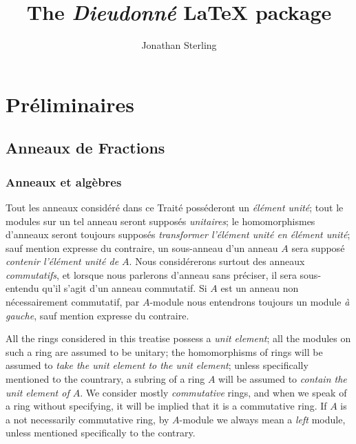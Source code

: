 \documentclass[french]{ega}
\title{The \emph{Dieudonné} \LaTeX{} package}
\author{Jonathan Sterling}
\begin{document}
\maketitle

\tableofcontents*

\mainmatter
{}
\chapter{Préliminaires}

\section{Anneaux de Fractions}

\subsection{Anneaux et algèbres}

\vspace{-1em}
\begin{minipage}[t]{0.5\textwidth}
  \begin{node}
    Tout les anneaux considéré dans ce Traité posséderont un
    \emph{élément unité}; tout le modules sur un tel anneau seront
    supposés \emph{unitaires}; le homomorphismes d'anneaux seront toujours
    supposés \emph{transformer l'élément unité en élément unité};
    sauf mention expresse du contraire, un sous-anneau d'un anneau \(A\) sera
    supposé \emph{contenir l'élément unité de \(A\)}. Nous considérerons
    surtout des anneaux \emph{commutatifs}, et lorsque nous parlerons  d'anneau
    sans préciser, il sera sous-entendu qu'il s'agit d'un anneau commutatif. Si
    \(A\) est un anneau non nécessairement commutatif, par \(A\)-module nous
    entendrons toujours un module \emph{à gauche}, sauf mention expresse du
    contraire.
  \end{node}
\end{minipage}
\quad
\begin{minipage}[t]{0.5\textwidth}
  \addtocounter{node}{-1}

  \begin{node}
    All the rings considered in this treatise possess a \emph{unit element};
    all the modules on such a ring are assumed to be unitary; the homomorphisms
    of rings will be assumed to \emph{take the unit element to the unit element};
    unless specifically mentioned to the countrary, a subring of a ring \(A\)
    will be assumed to \emph{contain the unit element of \(A\)}. We consider
    mostly \emph{commutative} rings, and when we speak of a ring without
    specifying, it will be implied that  it is a commutative ring. If \(A\) is a
    not necessarily commutative ring, by \(A\)-module we always mean a
    \emph{left} module, unless mentioned specifically to the contrary.
  \end{node}

\end{minipage}
\medskip
\end{document}
